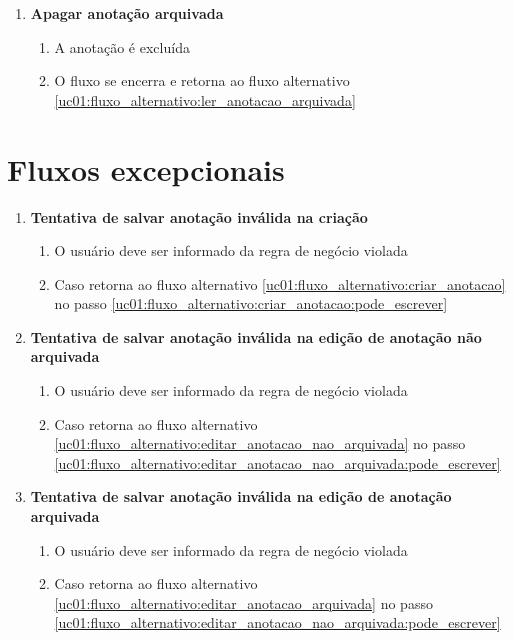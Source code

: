 \documentclass[
	12pt,				%
	oneside,			%
	a4paper,			%
	english,			%
	brazil,				%
	]{abntex2}
\begin{document}
\begin{enumerate}[label=\textbf{UC01-FA{\arabic*}},font=\normalsize]
    \item \textbf{\normalsize Apagar anotação arquivada} \label{uc01:fluxo_alternativo:apagar_anotacao_arquivada}
    \begin{enumerate}[label={\arabic*}.]
        \item A anotação é excluída
        \item O fluxo se encerra e retorna ao fluxo alternativo \ref{uc01:fluxo_alternativo:ler_anotacao_arquivada}
    \end{enumerate}
\end{enumerate}

\section{Fluxos excepcionais}
\begin{enumerate}[label=\textbf{UC01-FE{\arabic*}},font=\normalsize]
    \item \textbf{\normalsize Tentativa de salvar anotação inválida na criação} \label{uc01:fluxo_excepcional:criacao_invalida}
    \begin{enumerate}[label={\arabic*}.]
        \item O usuário deve ser informado da regra de negócio violada
        \item Caso retorna ao fluxo alternativo \ref{uc01:fluxo_alternativo:criar_anotacao} no passo \ref{uc01:fluxo_alternativo:criar_anotacao:pode_escrever}
    \end{enumerate}
    
    \item \textbf{\normalsize Tentativa de salvar anotação inválida na edição de anotação não arquivada} \label{uc01:fluxo_excepcional:edicao_nao_arquivada_invalida}
    \begin{enumerate}[label={\arabic*}.]
        \item O usuário deve ser informado da regra de negócio violada
        \item Caso retorna ao fluxo alternativo \ref{uc01:fluxo_alternativo:editar_anotacao_nao_arquivada} no passo \ref{uc01:fluxo_alternativo:editar_anotacao_nao_arquivada:pode_escrever}
    \end{enumerate}

    \item \textbf{\normalsize Tentativa de salvar anotação inválida na edição de anotação arquivada} \label{uc01:fluxo_excepcional:edicao_arquivada_invalida}
    \begin{enumerate}[label={\arabic*}.]
        \item O usuário deve ser informado da regra de negócio violada
        \item Caso retorna ao fluxo alternativo \ref{uc01:fluxo_alternativo:editar_anotacao_arquivada} no passo \ref{uc01:fluxo_alternativo:editar_anotacao_nao_arquivada:pode_escrever}
    \end{enumerate}
\end{enumerate}
\end{document}
